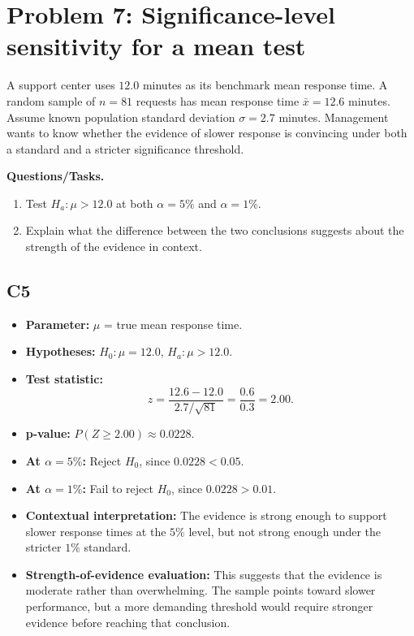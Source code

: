 	\section{Problem 7: Significance-level sensitivity for a mean test}
	A support center uses \(12.0\) minutes as its benchmark mean response time. A random sample of \(n=81\) requests has mean response time \(\bar x=12.6\) minutes. Assume known population standard deviation \(\sigma=2.7\) minutes. Management wants to know whether the evidence of slower response is convincing under both a standard and a stricter significance threshold.
	
	\textbf{Questions/Tasks.}
	\begin{enumerate}
		\item[(a)] Test \(H_a:\mu>12.0\) at both \(\alpha=5\%\) and \(\alpha=1\%\).
		\item[(b)] Explain what the difference between the two conclusions suggests about the strength of the evidence in context.
	\end{enumerate}
	
	\subsection*{C5}
	\begin{itemize}
		\item \textbf{Parameter:} \(\mu\) = true mean response time.
		\item \textbf{Hypotheses:} \(H_0:\mu=12.0\), \(H_a:\mu>12.0\).
		\item \textbf{Test statistic:}
		\[
		z=\frac{12.6-12.0}{2.7/\sqrt{81}}=\frac{0.6}{0.3}=2.00.
		\]
		\item \textbf{p-value:} \(P(Z\ge2.00)\approx0.0228\).
		\item \textbf{At \(\alpha=5\%\):} Reject \(H_0\), since \(0.0228<0.05\).
		\item \textbf{At \(\alpha=1\%\):} Fail to reject \(H_0\), since \(0.0228>0.01\).
		\item \textbf{Contextual interpretation:} The evidence is strong enough to support slower response times at the \(5\%\) level, but not strong enough under the stricter \(1\%\) standard.
		\item \textbf{Strength-of-evidence evaluation:} This suggests that the evidence is moderate rather than overwhelming. The sample points toward slower performance, but a more demanding threshold would require stronger evidence before reaching that conclusion.
	\end{itemize}
	
